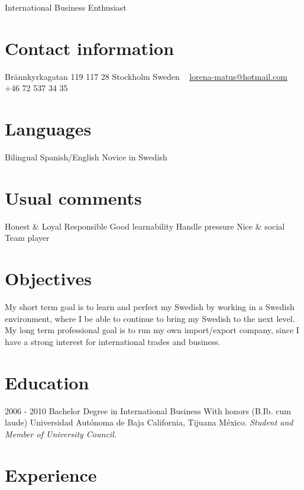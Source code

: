 \documentclass[]{friggeri-cv}
\begin{document}
       {International Business Enthusiast}

\begin{aside}
  \section{Contact information}
    Brännkyrkagatan 119
    117 28 Stockholm
    Sweden
    ~
    \href{mailto:lorena-matus@hotmail.com}{lorena-matus@hotmail.com}
    +46 72 537 34 35
  \section{Languages}
    Bilingual Spanish/English
    Novice in Swedish
  \section{Usual comments}
    Honest \& Loyal
    Responsible
    Good learnability
    Handle pressure
    Nice \& social 
    Team player
\end{aside}

\section{Objectives}
    My short term goal is to learn and perfect my Swedish by working in a Swedish environment, where I be able to continue to bring my Swedish to the next level.
    My long term professional goal is to run my own import/export company, since I have a strong interest for international trades and business.

\section{Education}

\begin{entrylist}
  \entry
    {2006 - 2010}
    {Bachelor Degree in International Business}
    {With honors (B.Ib. cum laude)}
    {Universidad Autónoma de Baja California, Tijuana México.
    {\emph{Student and Member of University Council.}}}
\end{entrylist}

\section{Experience}
\end{document}
